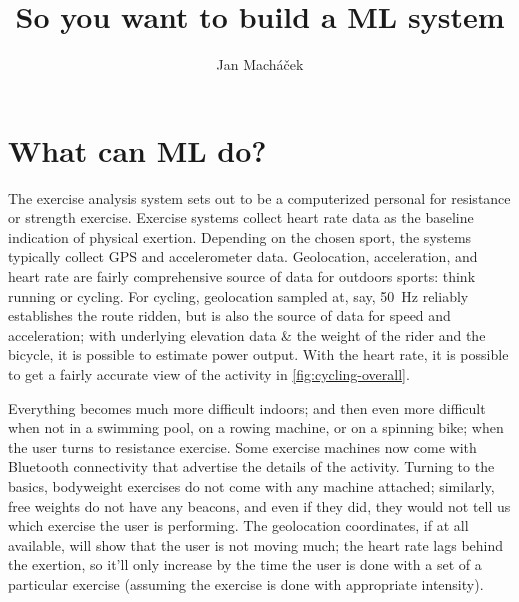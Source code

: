 



\title{So you want to build a ML system}

\author{Jan Macháček}




\section{What can ML do?}
The exercise analysis system sets out to be a computerized personal for resistance or strength exercise. Exercise systems collect heart rate data as the baseline indication of physical exertion. Depending on the chosen sport, the systems typically collect GPS and accelerometer data. Geolocation, acceleration, and heart rate are fairly comprehensive source of data for outdoors sports: think running or cycling. For cycling, geolocation sampled at, say, \SI{50}{\hertz} reliably establishes the route ridden, but is also the source of data for speed and acceleration; with underlying elevation data \& the weight of the rider and the bicycle, it is possible to estimate power output. With the heart rate, it is possible to get a  fairly accurate view of the activity in \autoref{fig:cycling-overall}.


Everything becomes much more difficult indoors; and then even more difficult when not in a swimming pool, on a rowing machine, or on a spinning bike; when the user turns to resistance exercise. Some exercise machines now come with Bluetooth connectivity that advertise the details of the activity. Turning to the basics, bodyweight exercises do not come with any machine attached; similarly, free weights do not have any beacons, and even if they did, they would not tell us which exercise the user is performing. The geolocation coordinates, if at all available, will show that the user is not moving much; the heart rate lags behind the exertion, so it'll only increase by the time the user is done with a set of a particular exercise (assuming the exercise is done with appropriate intensity).

